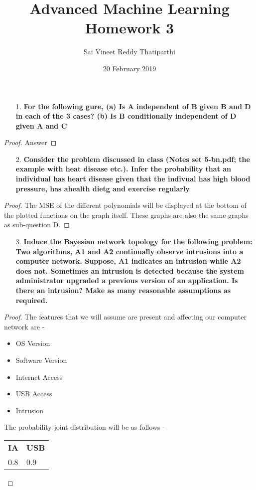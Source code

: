 \documentclass{article}
\date{20 February 2019}
\theoremstyle{case}
\begin{document}
\author{Sai Vineet Reddy Thatiparthi}

 \title{%
  Advanced Machine Learning \\
  \large Homework 3}
\maketitle
\begin{enumerate}
    \item [1.] \textbf{For the following gure, (a) Is A independent of B given B and D in each
of the 3 cases? (b) Is B conditionally independent of D given A and C}
\end{enumerate} 
\begin{proof} 
Answer
\end{proof}

\begin{enumerate}
    \item [2.] \textbf{Consider the problem discussed in class (Notes set 5-bn.pdf; the example
with heat disease etc.). Infer the probability that an individual has heart
disease given that the indivual has high blood pressure, has ahealth dietg
and exercise regularly}
\end{enumerate}
\begin{proof}
The MSE of the different polynomials will be displayed at the bottom of the plotted functions on the graph itself. These graphs are also the same graphs as sub-question D.

\end{proof}
\begin{enumerate}
    \item [3.] \textbf{Induce the Bayesian network topology for the following problem: Two
algorithms, A1 and A2 continually observe intrusions into a computer
network. Suppose, A1 indicates an intrusion while A2 does not. Sometimes
an intrusion is detected because the system administrator upgraded a
previous version of an application. Is there an intrusion? Make as many
reasonable assumptions as required.}
\end{enumerate} 
\begin{proof} 
The features that we will assume are present and affecting our computer network are - 
\begin{itemize}
  \item OS Version
  \item Software Version
  \item Internet Access
  \item USB Access
  \item Intrusion
\end{itemize}
The probability joint distribution will be as follows -
\begin{table}[]
\begin{tabular}{ll}
\textbf{IA} & \textbf{USB} \\
0.8 & 0.9
\end{tabular}
\end{table}
\end{proof}
\end{document}
